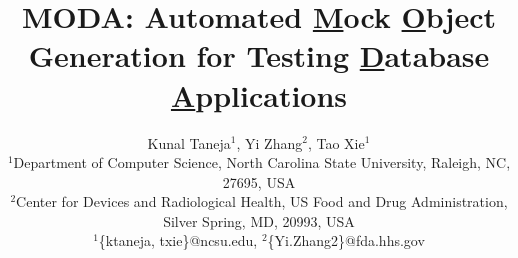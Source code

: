 \documentclass{sig-alternate}
\begin{document}
%
\title{MODA: Automated \underline{M}ock \underline{O}bject Generation for Testing \underline{D}atabase \underline{A}pplications}


\author{
Kunal Taneja$^1$, \hspace{0.05in} Yi Zhang$^2$, \hspace{0.05in} Tao Xie$^1$\\
       \small{$^1$Department of Computer Science, North Carolina State University, Raleigh, NC, 27695, USA}\\
       \small{$^2$Center for Devices and
Radiological Health, US Food and Drug Administration, Silver Spring, MD,
20993, USA}\\
       \small{$^1$\{ktaneja, txie\}@ncsu.edu, $^2$\{Yi.Zhang2\}@fda.hhs.gov} 
}   


%







\maketitle









\end{document}
